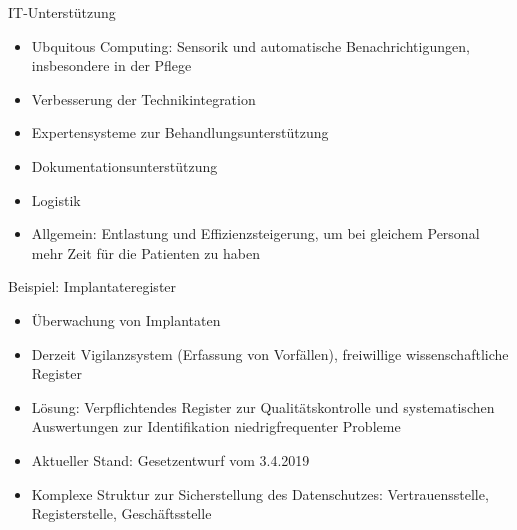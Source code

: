 \documentclass[aspectratio=169,t]{beamer}
\begin{document}
\begin{frame}{IT-Unterstützung}
  \begin{itemize}
      \item Ubquitous Computing: Sensorik und automatische Benachrichtigungen, insbesondere in der Pflege
      \item<2-> Verbesserung der Technikintegration
      \item<3-> Expertensysteme zur Behandlungsunterstützung
      \item<4-> Dokumentationsunterstützung
      \item<5-> Logistik
      \item<6-> Allgemein: Entlastung und Effizienzsteigerung, um bei gleichem Personal mehr Zeit für die Patienten zu haben
  \end{itemize}
\end{frame}

\begin{frame}{Beispiel: Implantateregister}
  \begin{itemize}
      \item Überwachung von Implantaten
      \item Derzeit Vigilanzsystem (Erfassung von Vorfällen), freiwillige wissenschaftliche Register
      \item<2-> Lösung: Verpflichtendes Register zur Qualitätskontrolle und systematischen Auswertungen zur Identifikation niedrigfrequenter Probleme
      \item<3-> Aktueller Stand: Gesetzentwurf vom 3.4.2019
      \item<4-> Komplexe Struktur zur Sicherstellung des Datenschutzes: Vertrauensstelle, Registerstelle, Geschäftsstelle
  \end{itemize}
\end{frame}
\end{document}
